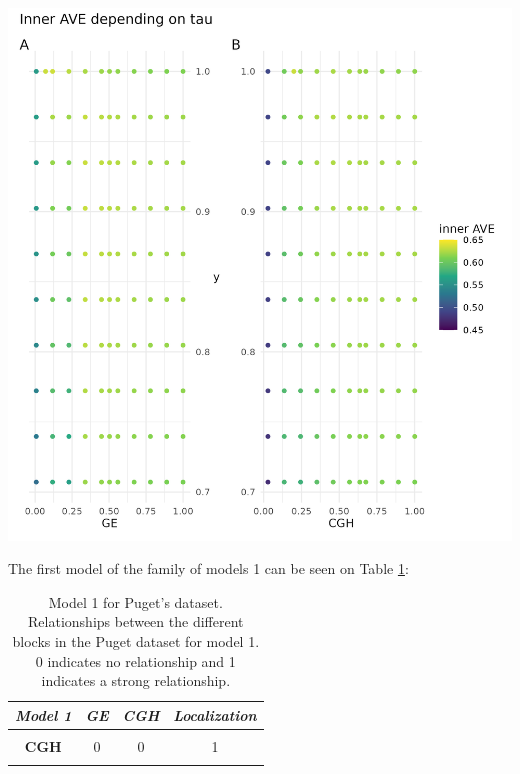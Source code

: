\documentclass[
  12pt,
  a4paper,
  twoside,
  openright]{book}
\let\origfigure\figure
\let\endorigfigure\endfigure
\renewenvironment{figure}[1][2] {
    \expandafter\origfigure\expandafter[!htp]
} {
    \endorigfigure
}
\begin{document}
\begin{figure}
\includegraphics[width=1\linewidth]{images/pugets_tau_to_AVE} \caption[Effect of tau on the inner AVE on Puget's dataset.]{Effect of tau on the inner AVE on Puget's dataset. The suggested tau value is the column between the regular grid, on the ordinate axis the y's tau values and on the abscissa the gene expression (GE) on the left and the comparative genomic hybridization (CGH) on the right. The highest inner AVE is with high tau values for y and middle to upper values for GE and CGH.}\label{fig:puget-tau2AVE}
\end{figure}

The first model of the family of models 1 can be seen on Table \ref{tab:puget-model1}:

\begin{table}[H]

\caption[Model 1 for the Puget's dataset.]{\label{tab:puget-model1}Model 1 for Puget's dataset. Relationships between the different blocks in the Puget dataset for model 1. 0 indicates no relationship and 1 indicates a strong relationship.}
\centering
\begin{tabular}[t]{|>{}c|c|c|>{}c|}
\hline
\em{\textbf{Model 1}} & \em{\textbf{GE}} & \em{\textbf{CGH}} & \em{\textbf{Localization}}\\
\hline
\textbf{\cellcolor{gray!6}{GE}} & \cellcolor{gray!6}{0} & \cellcolor{gray!6}{0} & \cellcolor{gray!6}{1}\\
\hline
\textbf{CGH} & 0 & 0 & 1\\
\hline
\textbf{\cellcolor{gray!6}{Localization}} & \cellcolor{gray!6}{1} & \cellcolor{gray!6}{1} & \cellcolor{gray!6}{0}\\
\hline
\end{tabular}
\end{table}
\end{document}
